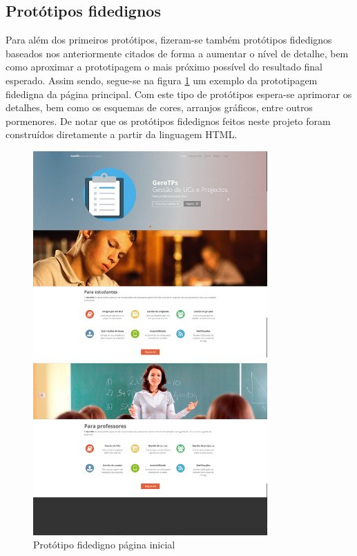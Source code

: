 \subsection{Protótipos fidedignos}
Para além dos primeiros protótipos, fizeram-se também protótipos fidedignos baseados nos anteriormente
citados de forma a aumentar o nível de detalhe, bem como aproximar a prototipagem o mais 
próximo possível do resultado final esperado. Assim sendo, segue-se na figura \ref{fig:prot_fid_home}
um exemplo da prototipagem fidedigna da página principal.
Com este tipo de protótipos espera-se aprimorar os detalhes, bem como os esquemas de cores,
arranjos gráficos, entre outros pormenores.
De notar que os protótipos fidedignos feitos neste projeto foram construídos diretamente a partir
da linguagem HTML.

\begin{figure}[H] 
  \centering
  \includegraphics[width=0.8\textwidth,center]{images/prototipos/fidedigno_home.jpg}
  \caption{Protótipo fidedigno página inicial}
  \label{fig:prot_fid_home}
\end{figure}

\newpage
